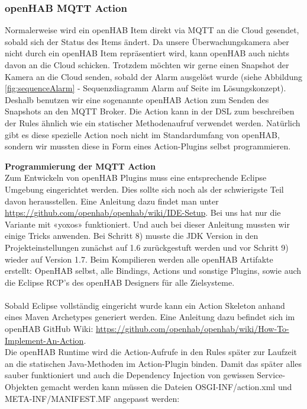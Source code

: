 \subsubsection{openHAB MQTT Action}
Normalerweise wird ein openHAB Item direkt via MQTT an die Cloud gesendet, sobald sich der Status des Items ändert. Da unsere Überwachungskamera aber nicht durch ein openHAB Item repräsentiert wird, kann openHAB auch nichts davon an die Cloud schicken. Trotzdem möchten wir gerne einen Snapshot der Kamera an die Cloud senden, sobald der Alarm ausgelöst wurde (siehe Abbildung \ref{fig:sequenceAlarm} - Sequenzdiagramm Alarm auf Seite \pageref{fig:sequenceAlarm} im Lösungskonzept). \\
Deshalb benutzen wir eine sogenannte openHAB Action zum Senden des Snapshots an den MQTT Broker. Die Action kann in der DSL zum beschreiben der Rules ähnlich wie ein statischer Methodenaufruf verwendet werden. Natürlich gibt es diese spezielle Action noch nicht im Standardumfang von openHAB, sondern wir mussten diese in Form eines Action-Plugins selbst programmieren.

\textbf{Programmierung der MQTT Action}\\
Zum Entwickeln von openHAB Plugins muss eine entsprechende Eclipse Umgebung eingerichtet werden. Dies sollte sich noch als der schwierigste Teil davon herausstellen. Eine Anleitung dazu findet man unter \url{https://github.com/openhab/openhab/wiki/IDE-Setup}. Bei uns hat nur die Variante mit «yoxos» funktioniert. Und auch bei dieser Anleitung mussten wir einige Tricks anwenden. Bei Schritt 8) musste die JDK Version in den Projekteinstellungen zunächst auf 1.6 zurückgestuft werden und vor Schritt 9) wieder auf Version 1.7. Beim Kompilieren werden alle openHAB Artifakte erstellt: OpenHAB selbst, alle Bindings, Actions und sonstige Plugins, sowie auch die Eclipse RCP's des openHAB Designers für alle Zielsysteme. 
\\ \\
Sobald Eclipse vollständig eingericht wurde kann ein Action Skeleton anhand eines Maven Archetypes generiert werden. Eine Anleitung dazu befindet sich im openHAB GitHub Wiki: \url{https://github.com/openhab/openhab/wiki/How-To-Implement-An-Action}. \\
Die openHAB Runtime wird die Action-Aufrufe in den Rules später zur Laufzeit an die statischen Java-Methoden im Action-Plugin binden. Damit das später alles sauber funktioniert und auch die Dependency Injection von gewissen Service-Objekten gemacht werden kann müssen die Dateien OSGI-INF/action.xml und META-INF/MANIFEST.MF angepasst werden:

